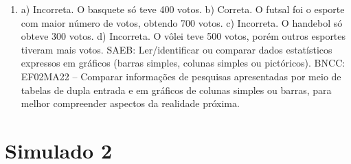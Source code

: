 \begin{enumerate}
\item
a) Incorreta. O basquete só teve 400 votos.
b) Correta. O futsal foi o esporte com maior número de votos, obtendo 700 votos.
c) Incorreta. O handebol só obteve 300 votos.
d) Incorreta. O vôlei teve 500 votos, porém outros esportes tiveram mais votos.
SAEB: Ler/identificar ou comparar dados estatísticos expressos
em gráficos (barras simples, colunas simples ou pictóricos).
BNCC: EF02MA22 -- Comparar informações de pesquisas apresentadas por meio
de tabelas de dupla entrada e em gráficos de colunas simples ou barras,
para melhor compreender aspectos da realidade próxima.

\end{enumerate}

\section*{Simulado 2}

